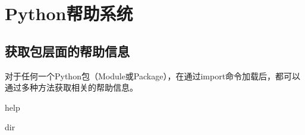 \chapter{Python帮助系统}

\section{获取包层面的帮助信息}

对于任何一个Python包（Module或Package），在通过import命令加载后，都可以通过多种方法获取相关的帮助信息。

help

dir
